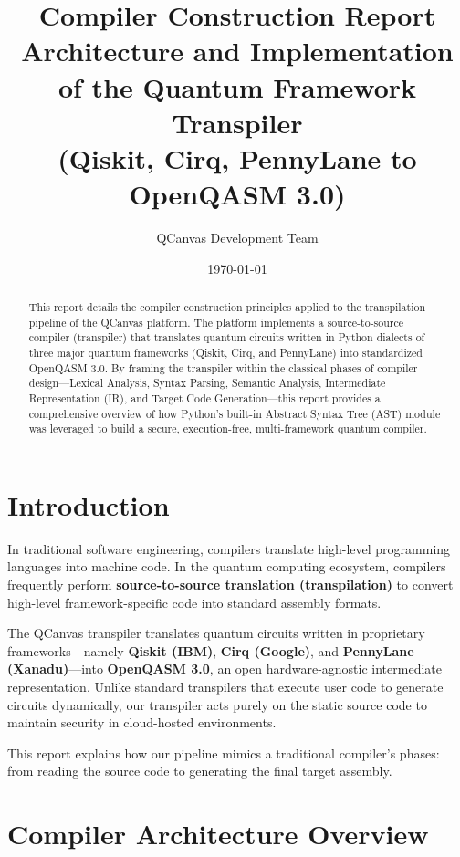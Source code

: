 \documentclass[12pt, a4paper]{article}
\title{\textbf{Compiler Construction Report}\\
\large Architecture and Implementation of the Quantum Framework Transpiler\\
(Qiskit, Cirq, PennyLane to OpenQASM 3.0)}
\author{QCanvas Development Team}
\date{\today}
\begin{document}
\maketitle

\begin{abstract}
This report details the compiler construction principles applied to the transpilation pipeline of the QCanvas platform. The platform implements a source-to-source compiler (transpiler) that translates quantum circuits written in Python dialects of three major quantum frameworks (Qiskit, Cirq, and PennyLane) into standardized OpenQASM 3.0. By framing the transpiler within the classical phases of compiler design---Lexical Analysis, Syntax Parsing, Semantic Analysis, Intermediate Representation (IR), and Target Code Generation---this report provides a comprehensive overview of how Python's built-in Abstract Syntax Tree (AST) module was leveraged to build a secure, execution-free, multi-framework quantum compiler.
\end{abstract}

\tableofcontents
\newpage

\section{Introduction}
\label{sec:introduction}

In traditional software engineering, compilers translate high-level programming languages into machine code. In the quantum computing ecosystem, compilers frequently perform \textbf{source-to-source translation (transpilation)} to convert high-level framework-specific code into standard assembly formats. 

The QCanvas transpiler translates quantum circuits written in proprietary frameworks---namely \textbf{Qiskit (IBM)}, \textbf{Cirq (Google)}, and \textbf{PennyLane (Xanadu)}---into \textbf{OpenQASM 3.0}, an open hardware-agnostic intermediate representation. Unlike standard transpilers that execute user code to generate circuits dynamically, our transpiler acts purely on the static source code to maintain security in cloud-hosted environments.

This report explains how our pipeline mimics a traditional compiler's phases: from reading the source code to generating the final target assembly.

\section{Compiler Architecture Overview}
\label{sec:architecture}
\end{document}

